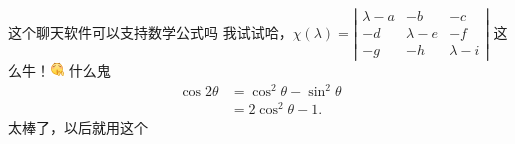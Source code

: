 \documentclass{kik-android}
\begin{document}
\hspace*{-0.8em}%
{这个聊天软件可以支持数学公式吗}
%
{我试试哈，$\chi(\lambda) = \left| \begin{array}{ccc}
\lambda - a & -b & -c \\
-d & \lambda - e & -f \\
-g & -h & \lambda - i \end{array} \right|$}
\me%
{这么牛！\includegraphics[height=1em]{img/1D3A20AC-E364-4430-9A5F-FA8B613FE279.png}}
%
{什么鬼\begin{align}
\cos 2\theta & =  \cos^2 \theta - \sin^2 \theta \\
& =  2 \cos^2 \theta - 1.
\end{align}}
%
{太棒了，以后就用这个}
\end{document}
